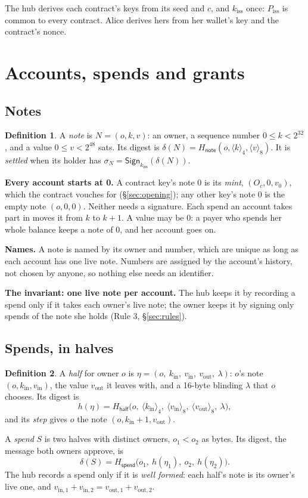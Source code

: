 \documentclass[11pt]{article}
\theoremstyle{plain}
\theoremstyle{definition}
\newtheorem{definition}{Definition}
\newcommand{\be}[2]{\langle #1\rangle_{#2}}
\newcommand{\Ht}[1]{H_{\textsf{#1}}}
\newcommand{\Sign}{\mathsf{Sign}}
\newcommand{\kiss}{k_{\mathrm{iss}}}
\newcommand{\Piss}{P_{\mathrm{iss}}}
\newcommand{\Oc}{O_c}
\newcommand{\kin}{k_{\mathrm{in}}}
\newcommand{\vin}{v_{\mathrm{in}}}
\newcommand{\vout}{v_{\mathrm{out}}}
\begin{document}
The hub derives each contract's keys from its seed and $c$, and $\kiss$
once: $\Piss$ is common to every contract. Alice derives hers from her
wallet's key and the contract's nonce.

\section{Accounts, spends and grants}

\subsection{Notes}\label{sec:notes}

\begin{definition}
A \emph{note} is $N = (o, k, v)$: an owner, a sequence number $0 \le k <
2^{32}$, and a value $0 \le v < 2^{48}$ sats. Its digest is $\delta(N) =
\Ht{note}(o, \be{k}{4}, \be{v}{8})$. It is \emph{settled} when its
holder has $\sigma_N = \Sign_{\kiss}(\delta(N))$.
\end{definition}

\textbf{Every account starts at 0.} A contract key's note 0 is its
\emph{mint}, $(\Oc, 0, v_0)$, which the contract vouches for
(\S\ref{sec:opening}); any other key's note 0 is the empty note $(o, 0,
0)$. Neither needs a signature. Each spend an account takes part in
moves it from $k$ to $k + 1$. A value may be 0: a payer who spends her
whole balance keeps a note of 0, and her account goes on.

\textbf{Names.} A note is named by its owner and number, which are
unique as long as each account has one live note. Numbers are assigned
by the account's history, not chosen by anyone, so nothing else needs
an identifier.

\textbf{The invariant: one live note per account.} The hub keeps it by
recording a spend only if it takes each owner's live note; the owner
keeps it by signing only spends of the note she holds (Rule 3,
\S\ref{sec:rules}).

\subsection{Spends, in halves}\label{sec:spend}

\begin{definition}
A \emph{half} for owner $o$ is $\eta = (o,\ \kin,\ \vin,\ \vout,\
\lambda)$: $o$'s note $(o, \kin, \vin)$, the value $\vout$ it leaves
with, and a 16-byte blinding $\lambda$ that $o$ chooses. Its digest is
\[
  h(\eta) = \Ht{half}\big(o,\ \be{\kin}{4},\ \be{\vin}{8},\
  \be{\vout}{8},\ \lambda\big),
\]
and its \emph{step} gives $o$ the note $(o, \kin + 1, \vout)$.

A \emph{spend} $S$ is two halves with distinct owners, $o_1 < o_2$ as
bytes. Its digest, the message both owners approve, is
\[
  \delta(S) = \Ht{spend}\big(o_1,\ h(\eta_1),\ o_2,\ h(\eta_2)\big).
\]
The hub records a spend only if it is \emph{well formed}: each half's
note is its owner's live one, and $v_{\mathrm{in},1} + v_{\mathrm{in},2}
= v_{\mathrm{out},1} + v_{\mathrm{out},2}$.
\end{definition}
\end{document}
